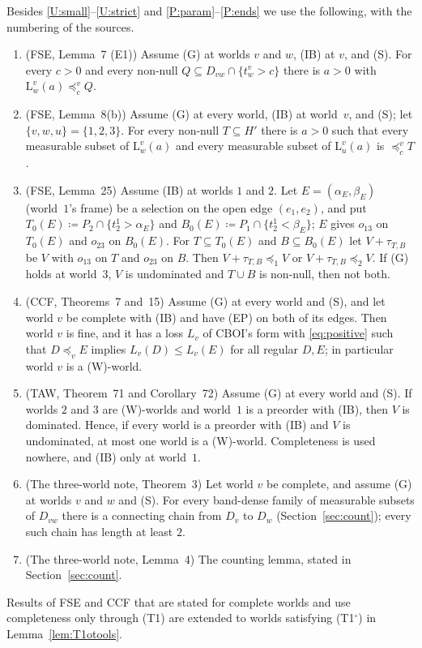 \documentclass[11pt]{article}
\theoremstyle{definition}\newtheorem{definition}[theorem]{Definition}
\theoremstyle{remark}\newtheorem{remark}[theorem]{Remark}
\newcommand{\Lo}[3]{\mathrm L^{#1}_{#2}(#3)}
\newcommand{\To}{\textup{(T1$^\circ$)}}
\begin{document}
Besides \ref{U:small}--\ref{U:strict} and \ref{P:param}--\ref{P:ends} we
use the following, with the numbering of the sources.
\begin{enumerate}[label=(R\arabic*),leftmargin=*,itemsep=3pt]
\item\label{R:E1} (FSE, Lemma~7 (E1)) Assume (G) at worlds $v$ and $w$,
(IB) at $v$, and (S). For every $c>0$ and every non-null $Q\subseteq
D_{vw}\cap\{t^v_w>c\}$ there is $a>0$ with $\Lo vwa\preceq^v_cQ$.
\item\label{R:yardc} (FSE, Lemma~8(b)) Assume (G) at every world, (IB) at
world~$v$, and (S); let $\{v,w,u\}=\{1,2,3\}$. For every non-null
$T\subseteq H'$ there is $a>0$ such that every measurable subset of $\Lo
vwa$ and every measurable subset of $\Lo vua$ is $\preceq^v_cT$.
\item\label{R:XOR} (FSE, Lemma~25) Assume (IB) at worlds $1$ and $2$. Let
$E=(\alpha_E,\beta_E)$ (world~$1$'s frame) be a selection on the open edge
$(e_1,e_2)$, and put $T_0(E)\coloneqq P_2\cap\{t^1_2>\alpha_E\}$ and
$B_0(E)\coloneqq P_1\cap\{t^1_2<\beta_E\}$; $E$ gives $o_{13}$ on $T_0(E)$
and $o_{23}$ on $B_0(E)$. For $T\subseteq T_0(E)$ and $B\subseteq B_0(E)$
let $V+\tau_{T,B}$ be $V$ with $o_{13}$ on $T$ and $o_{23}$ on $B$. Then
$V+\tau_{T,B}\preceq_1V$ or $V+\tau_{T,B}\preceq_2V$. If (G) holds at
world~$3$, $V$ is undominated and $T\cup B$ is non-null, then not both.
\item\label{R:CCF} (CCF, Theorems~7 and~15) Assume (G) at every world and
(S), and let world $v$ be complete with (IB) and have (EP) on both of its
edges. Then world $v$ is fine, and it has a loss $L_v$ of CBOI's form with
\eqref{eq:positive} such that $D\preceq_vE$ implies $L_v(D)\le L_v(E)$ for
all regular $D,E$; in particular world $v$ is a (W)-world.
\item\label{R:TAW} (TAW, Theorem~71 and Corollary~72) Assume (G) at every
world and (S). If worlds $2$ and $3$ are (W)-worlds and world~$1$ is a
preorder with (IB), then $V$ is dominated. Hence, if every world is a
preorder with (IB) and $V$ is undominated, at most one world is a
(W)-world. Completeness is used nowhere, and (IB) only at world~$1$.
\item\label{R:cut} (The three-world note, Theorem~3) Let world $v$ be
complete, and assume (G) at worlds $v$ and $w$ and (S). For every
band-dense family of measurable subsets of $D_{vw}$ there is a connecting
chain from $D_v$ to $D_w$ (Section~\ref{sec:count}); every such chain has
length at least $2$.
\item\label{R:count} (The three-world note, Lemma~4) The counting lemma,
stated in Section~\ref{sec:count}.
\end{enumerate}
Results of FSE and CCF that are stated for complete worlds and use
completeness only through (T1) are extended to worlds satisfying \To{} in
Lemma~\ref{lem:T1otools}.
\end{document}
